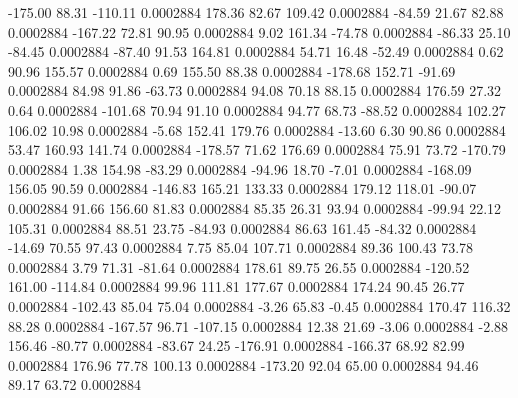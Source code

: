      -175.00       88.31     -110.11     0.0002884
      178.36       82.67      109.42     0.0002884
      -84.59       21.67       82.88     0.0002884
     -167.22       72.81       90.95     0.0002884
        9.02      161.34      -74.78     0.0002884
      -86.33       25.10      -84.45     0.0002884
      -87.40       91.53      164.81     0.0002884
       54.71       16.48      -52.49     0.0002884
        0.62       90.96      155.57     0.0002884
        0.69      155.50       88.38     0.0002884
     -178.68      152.71      -91.69     0.0002884
       84.98       91.86      -63.73     0.0002884
       94.08       70.18       88.15     0.0002884
      176.59       27.32        0.64     0.0002884
     -101.68       70.94       91.10     0.0002884
       94.77       68.73      -88.52     0.0002884
      102.27      106.02       10.98     0.0002884
       -5.68      152.41      179.76     0.0002884
      -13.60        6.30       90.86     0.0002884
       53.47      160.93      141.74     0.0002884
     -178.57       71.62      176.69     0.0002884
       75.91       73.72     -170.79     0.0002884
        1.38      154.98      -83.29     0.0002884
      -94.96       18.70       -7.01     0.0002884
     -168.09      156.05       90.59     0.0002884
     -146.83      165.21      133.33     0.0002884
      179.12      118.01      -90.07     0.0002884
       91.66      156.60       81.83     0.0002884
       85.35       26.31       93.94     0.0002884
      -99.94       22.12      105.31     0.0002884
       88.51       23.75      -84.93     0.0002884
       86.63      161.45      -84.32     0.0002884
      -14.69       70.55       97.43     0.0002884
        7.75       85.04      107.71     0.0002884
       89.36      100.43       73.78     0.0002884
        3.79       71.31      -81.64     0.0002884
      178.61       89.75       26.55     0.0002884
     -120.52      161.00     -114.84     0.0002884
       99.96      111.81      177.67     0.0002884
      174.24       90.45       26.77     0.0002884
     -102.43       85.04       75.04     0.0002884
       -3.26       65.83       -0.45     0.0002884
      170.47      116.32       88.28     0.0002884
     -167.57       96.71     -107.15     0.0002884
       12.38       21.69       -3.06     0.0002884
       -2.88      156.46      -80.77     0.0002884
      -83.67       24.25     -176.91     0.0002884
     -166.37       68.92       82.99     0.0002884
      176.96       77.78      100.13     0.0002884
     -173.20       92.04       65.00     0.0002884
       94.46       89.17       63.72     0.0002884
